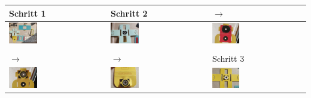 		\begin{center}
			\begin{tabular}{*{3}{l}}
				\multicolumn{1}{l|}{Schritt 1} & Schritt 2 & $\rightarrow$\\
				\midrule
				\multicolumn{1}{l|}{\includegraphics[width=0.3\textwidth]{images/aufbau/1_1.jpg}} & 
				\includegraphics[width=0.3\textwidth]{images/aufbau/2_1.jpg} & 
				\includegraphics[width=0.3\textwidth]{images/aufbau/2_2.jpg} \\
				\\[-0.5em]
				$\rightarrow$ & \multicolumn{1}{l|}{$\rightarrow$} & Schritt 3 \\
				\midrule
				\includegraphics[width=0.3\textwidth]{images/aufbau/2_3.jpg} &
				\multicolumn{1}{l|}{\includegraphics[width=0.3\textwidth]{images/aufbau/2_4.jpg}} &
				\includegraphics[width=0.3\textwidth]{images/aufbau/3_1.jpg} 

\end{tabular}
\end{center}
